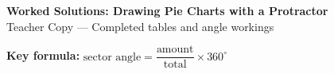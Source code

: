 \documentclass[a4paper,12pt]{article}
\begin{document}
\begin{center}
  {\LARGE\bfseries Worked Solutions: Drawing Pie Charts with a Protractor}\\[6pt]
  {\large Teacher Copy --- Completed tables and angle workings}
\end{center}

\vspace{4pt}

\begin{mdframed}[backgroundcolor=boxgreen, linecolor=slice3,
                 linewidth=1.5pt, roundcorner=6pt]
  \textbf{Key formula:}\quad
  $\text{sector angle}=\dfrac{\text{amount}}{\text{total}}\times 360^\circ$
\end{mdframed}

\vspace{6pt}
\end{document}
